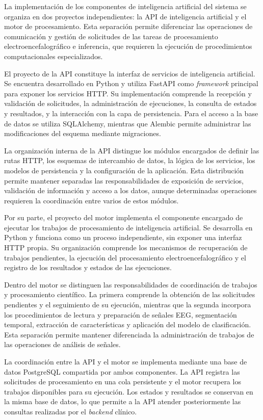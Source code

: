 La implementación de los componentes de inteligencia
artificial del sistema se organiza en dos proyectos
independientes: la API de inteligencia artificial y el motor de procesamiento. Esta separación permite
diferenciar las operaciones de comunicación y gestión
de solicitudes de las tareas de procesamiento
electroencefalográfico e inferencia, que requieren
la ejecución de procedimientos computacionales
especializados.

El proyecto de la API constituye la
interfaz de servicios de inteligencia artificial.
Se encuentra desarrollado en Python y utiliza
FastAPI como \textit{framework} principal para exponer
los servicios HTTP. Su implementación comprende
la recepción y validación de solicitudes, la
administración de ejecuciones, la consulta de
estados y resultados, y la interacción con la
capa de persistencia. Para el acceso a la base
de datos se utiliza SQLAlchemy, mientras que
Alembic permite administrar las modificaciones
del esquema mediante migraciones.

La organización interna de la API distingue
los módulos encargados de definir las rutas
HTTP, los esquemas de intercambio de datos,
la lógica de los servicios, los modelos de
persistencia y la configuración de la aplicación.
Esta distribución permite mantener separadas
las responsabilidades de exposición de servicios,
validación de información y acceso a los datos,
aunque determinadas operaciones requieren
la coordinación entre varios de estos módulos.

Por su parte, el proyecto del motor implementa el componente
encargado de ejecutar los trabajos de procesamiento
de inteligencia artificial. Se desarrolla en Python
y funciona como un proceso independiente, sin
exponer una interfaz HTTP propia. Su organización
comprende los mecanismos de recuperación de
trabajos pendientes, la ejecución del procesamiento
electroencefalográfico y el registro de los
resultados y estados de las ejecuciones.

Dentro del motor se distinguen las responsabilidades
de coordinación de trabajos y procesamiento
científico. La primera comprende la obtención de
las solicitudes pendientes y el seguimiento de
su ejecución, mientras que la segunda incorpora
los procedimientos de lectura y preparación
de señales EEG, segmentación temporal, extracción
de características y aplicación del modelo
de clasificación. Esta separación permite
mantener diferenciada la administración de
trabajos de las operaciones de análisis de señales.

La coordinación entre la API y el motor se
implementa mediante una base de datos PostgreSQL
compartida por ambos componentes. La API registra las solicitudes de procesamiento
en una cola persistente
y el motor recupera los trabajos disponibles
para su ejecución. Los estados y resultados
se conservan en la misma base de datos, lo que
permite a la API atender posteriormente las
consultas realizadas por el \textit{backend} clínico.


